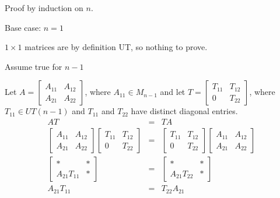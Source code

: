 \documentclass[letterpaper,12pt,fleqn]{article}
\begin{document}
\begin{theproof}
  Proof by induction on $n$.
  \begin{description}
  \item Base case: $n=1$

    $1\times1$ matrices are by definition UT, so nothing to prove.

  \item Assume true for $n-1$

  \item Let $A=\begin{bmatrix} A_{11} & A_{12} \\ A_{21} & A_{22} \end{bmatrix}$, where
    $A_{11}\in M_{n-1}$ and let
    $T=\begin{bmatrix} T_{11} & T_{12} \\ 0 & T_{22} \end{bmatrix}$, where
    $T_{11}\in UT(n-1)$ and $T_{11}$ and $T_{22}$ have distinct diagonal entries.
    \begin{eqnarray*}
      AT &=& TA \\
      \begin{bmatrix} A_{11} & A_{12} \\ A_{21} & A_{22} \end{bmatrix}
      \begin{bmatrix} T_{11} & T_{12} \\ 0 & T_{22} \end{bmatrix} &=&
      \begin{bmatrix} T_{11} & T_{12} \\ 0 & T_{22} \end{bmatrix} 
      \begin{bmatrix} A_{11} & A_{12} \\ A_{21} & A_{22} \end{bmatrix} \\
      \begin{bmatrix} * & * \\ A_{21}T_{11} & * \end{bmatrix} &=&
      \begin{bmatrix} * & * \\ A_{21}T_{22} & * \end{bmatrix} \\
      A_{21}T_{11} &=& T_{22}A_{21} \\
    \end{eqnarray*}

  \end{description}
\end{theproof}
\end{document}
